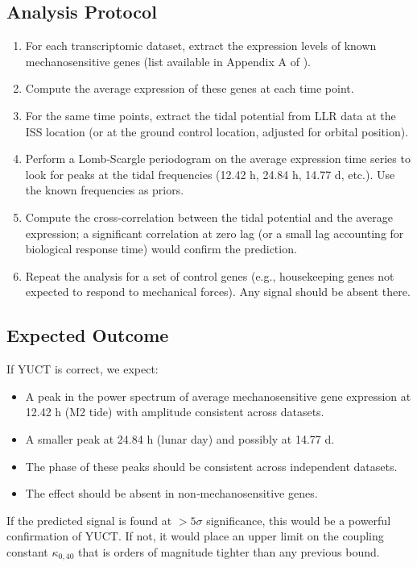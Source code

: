 \documentclass[12pt,a4paper]{article}
\theoremstyle{remark}
\begin{document}
	\subsection{Analysis Protocol}
	
	\begin{enumerate}
		\item For each transcriptomic dataset, extract the expression levels of known mechanosensitive genes (list available in Appendix A of \cite{NASA-GeneLab}).
		\item Compute the average expression of these genes at each time point.
		\item For the same time points, extract the tidal potential from LLR data at the ISS location (or at the ground control location, adjusted for orbital position).
		\item Perform a Lomb‑Scargle periodogram on the average expression time series to look for peaks at the tidal frequencies (12.42 h, 24.84 h, 14.77 d, etc.). Use the known frequencies as priors.
		\item Compute the cross‑correlation between the tidal potential and the average expression; a significant correlation at zero lag (or a small lag accounting for biological response time) would confirm the prediction.
		\item Repeat the analysis for a set of control genes (e.g., housekeeping genes not expected to respond to mechanical forces). Any signal should be absent there.
	\end{enumerate}
	
	\subsection{Expected Outcome}
	
	If YUCT is correct, we expect:
	\begin{itemize}
		\item A peak in the power spectrum of average mechanosensitive gene expression at 12.42 h (M2 tide) with amplitude consistent across datasets.
		\item A smaller peak at 24.84 h (lunar day) and possibly at 14.77 d.
		\item The phase of these peaks should be consistent across independent datasets.
		\item The effect should be absent in non‑mechanosensitive genes.
	\end{itemize}
	
	If the predicted signal is found at \(> 5\sigma\) significance, this would be a powerful confirmation of YUCT. If not, it would place an upper limit on the coupling constant \(\kappa_{0,40}\) that is orders of magnitude tighter than any previous bound.
	
\end{document}
